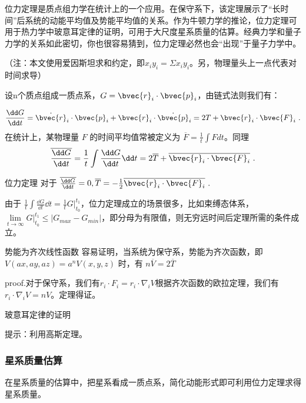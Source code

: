 

位力定理是质点组力学在统计上的一个应用。在保守系下，该定理展示了“长时间”后系统的动能平均值及势能平均值的关系。作为牛顿力学的推论，位力定理可用于热力学中玻意耳定律的证明，可用于大尺度星系质量的估算。经典力学和量子力学的关系如此密切，你也很容易猜到，位力定理必然也会“出现”于量子力学中。

（注：本文使用爱因斯坦求和约定，即$x_i y_i=\Sigma x_i y_i$。另，物理量头上一点代表对时间求导）

设n个质点组成一质点系，$G=\bvec{r}_i\cdot \bvec{p}_i$，由链式法则我们有：

\begin{equation}
\frac{\dd G}{\dd t}=\dot{\bvec{r}}_i\cdot \bvec{p}_i+\bvec{r}_i\cdot\dot{\bvec{p}}_i=2T+\bvec{r}_i\cdot \bvec{F}_i~.
\end{equation}
在统计上，某物理量 $F$ 的时间平均值常被定义为 $\overline{F}=\frac{1}{t}\int Fdt $。同理
\begin{equation}
\overline{\frac{\dd G}{\dd t}}=\frac{1}{t}\int \frac{\dd G}{\dd t}\dd t=2\overline{ T}+\overline{{\bvec{r}_i\cdot \bvec{F}_i}}~.
\end{equation}

\begin{theorem}{位力定理}
对于 $\overline{\frac{\dd G}{\dd t}}=0,
\overline{ T}=-\frac{1}{2}\overline{{\bvec{r}_i\cdot \bvec{F}_i}}~.$
\end{theorem}
由于 $\frac{1}{t}\int \frac{\dd G}{\dd t}\dd t=\frac{1}{t}G\big|_{t_0}^{t_1}$，位力定理成立的场景很多，比如束缚态体系，$\lim \limits_{t \to \infty}G\big|_{t_0}^{t_1}\leq \left|{G_{max}-G_{min}}\right|$，即分母为有限值，则无穷远时间后定理所需的条件成立。
\begin{corollary}{势能为齐次线性函数}
容易证明，当系统为保守系，势能为齐次函数，即 $V(ax,ay,az)=a^nV(x,y,z)$ 时，有 $n\overline{V}=2\overline{T}$
\end{corollary}
proof.对于保守系，我们有$r_i\cdot F_i=r_i\cdot \nabla_i V$根据齐次函数的欧拉定理，我们有$r_i\cdot \nabla_i V=n V$。定理得证。
\begin{exercise}{玻意耳定律的证明}
\end{exercise}
提示：利用高斯定理。
\subsubsection{星系质量估算}  
在星系质量的估算中，把星系看成一质点系，简化动能形式即可利用位力定理求得星系质量。
